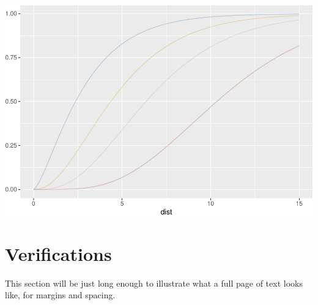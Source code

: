 \documentclass[12pt]{article}
\begin{document}
\begin{center}\includegraphics[width=0.5\linewidth]{skeleton_files/figure-latex/unnamed-chunk-10-2} \end{center}

\section{Verifications}
\label{sec:verify}

This section will be just long enough to illustrate what a full page of
text looks like, for margins and spacing.

\citep{tishkovskaya2012statistical}



\end{document}
